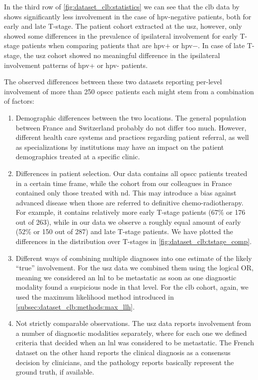 \documentclass[\relativeRoot/main.tex]{subfiles}
\begin{document}
In the third row of \cref{fig:dataset_clb:statistics} we can see that the \gls{clb} data by  shows significantly less involvement in the case of \gls{hpv}-negative patients, both for early and late T-stage. The patient cohort extracted at the \gls{usz}, however, only showed some differences in the prevalence of ipsilateral involvement for early T-stage patients when comparing patients that are \gls{hpv}$+$ or \gls{hpv}$-$. In case of late T-stage, the \gls{usz} cohort showed no meaningful difference in the ipsilateral involvement patterns of \gls{hpv}+ or \gls{hpv}- patients.

The observed differences between these two datasets reporting per-level involvement of more than 250 \gls{opscc} patients each might stem from a combination of factors:

\begin{enumerate}
    \item Demographic differences between the two locations. The general population between France and Switzerland probably do not differ too much. However, different health care systems and practices regarding patient referral, as well as specializations by institutions may have an impact on the patient demographics treated at a specific clinic.
    \item Differences in patient selection. Our data contains all \gls{opscc} patients treated in a certain time frame, while the cohort from our colleagues in France contained only those treated with \acrlong{nd}. This may introduce a bias against advanced disease when those are referred to definitive chemo-radiotherapy. For example, it contains relatively more early T-stage patients (67\% or 176 out of 263), while in our data we observe a roughly equal amount of early (52\% or 150 out of 287) and late T-stage patients. We have plotted the differences in the distribution over T-stages in \cref{fig:dataset_clb:tstage_comp}.
    \item Different ways of combining multiple diagnoses into one estimate of the likely ``true'' involvement. For the \gls{usz} data we combined them using the logical OR, meaning we considered an \gls{lnl} to be metastatic as soon as one diagnostic modality found a suspicious node in that level. For the \gls{clb} cohort, again, we used the maximum likelihood method introduced in \cref{subsec:dataset_clb:methods:max_llh}.
    \item Not strictly comparable observations. The \gls{usz} data reports involvement from a number of diagnostic modalities separately, where for each one we defined criteria that decided when an \gls{lnl} was considered to be metastatic. The French dataset on the other hand reports the clinical diagnosis as a consensus decision by clinicians, and the pathology reports basically represent the ground truth, if available.
\end{enumerate}
\end{document}
